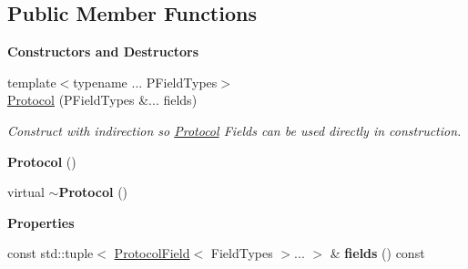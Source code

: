 \subsection*{Public Member Functions}
\begin{Indent}\textbf{ Constructors and Destructors}\par
\begin{DoxyCompactItemize}
\item 
\mbox{\label{classrev_1_1_protocol_ac2d8d7bfe618ea8497ae26f9fc93902d}} 
{\footnotesize template$<$typename ... P\+Field\+Types$>$ }\\\mbox{\hyperlink{classrev_1_1_protocol_ac2d8d7bfe618ea8497ae26f9fc93902d}{Protocol}} (P\+Field\+Types \&... fields)
\begin{DoxyCompactList}\small\item\em Construct with indirection so \mbox{\hyperlink{classrev_1_1_protocol}{Protocol}} Fields can be used directly in construction. \end{DoxyCompactList}\item 
\mbox{\label{classrev_1_1_protocol_a29344f6fabdcd4f790685ef07ac54c70}} 
{\bfseries Protocol} ()
\item 
\mbox{\label{classrev_1_1_protocol_af6af4e8dee401be2f641c6d838ccfedd}} 
virtual {\bfseries $\sim$\+Protocol} ()
\end{DoxyCompactItemize}
\end{Indent}
\begin{Indent}\textbf{ Properties}\par
\begin{DoxyCompactItemize}
\item 
\mbox{\label{classrev_1_1_protocol_ac6b691a23430a2b9245d82f71c1eb393}} 
const std\+::tuple$<$ \mbox{\hyperlink{structrev_1_1_protocol_field}{Protocol\+Field}}$<$ Field\+Types $>$... $>$ \& {\bfseries fields} () const
\end{DoxyCompactItemize}
\end{Indent}
